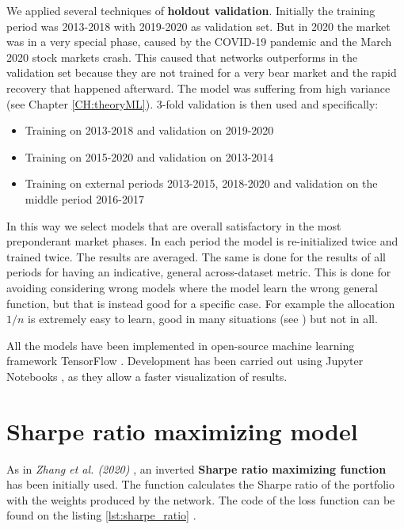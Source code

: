 We applied several techniques of \textbf{holdout validation}. Initially the training period was 2013-2018 with 2019-2020 as validation set. But in 2020 the market was in a very special phase, caused by the COVID-19 pandemic and the March 2020 stock markets crash. This caused that networks outperforms in the validation set because they are not trained for a very bear market and the rapid recovery that happened afterward. The model was suffering from high variance (see Chapter \ref{CH:theoryML}).
3-fold validation is then used and specifically:
\begin{itemize}
    \item Training on 2013-2018 and validation on 2019-2020
    \item Training on 2015-2020 and validation on 2013-2014
    \item Training on external periods 2013-2015, 2018-2020 and validation on the middle period 2016-2017
\end{itemize}
In this way we select models that are overall satisfactory in the most preponderant market phases. In each period the model is re-initialized twice and trained twice. The results are averaged. The same is done for the results of all periods for having an indicative, general across-dataset metric. This is done for avoiding considering wrong models where the model learn the wrong general function, but that is instead good for a specific case. For example the allocation $1/n$ is extremely easy to learn, good in many situations (see \cite{PFLUG2012410} \cite{demiguel2009} \cite{duchin2009markowitz}) but not in all.

\hfill \break

All the models have been implemented in open-source machine learning framework TensorFlow \cite{tensorflow2015-whitepaper}. Development has been carried out using Jupyter Notebooks \cite{Kluyver2016jupyter}, as they allow a faster visualization of results.


\section{Sharpe ratio maximizing model}
\label{s:sharpe_maximizing_model}

As in \textit{Zhang et al. (2020)} \cite{Zhang_2020}, an inverted \textbf{Sharpe ratio maximizing function} has been initially used. The function calculates the Sharpe ratio of the portfolio with the weights produced by the network. The code of the loss function can be found on the listing \ref{lst:sharpe_ratio} .


